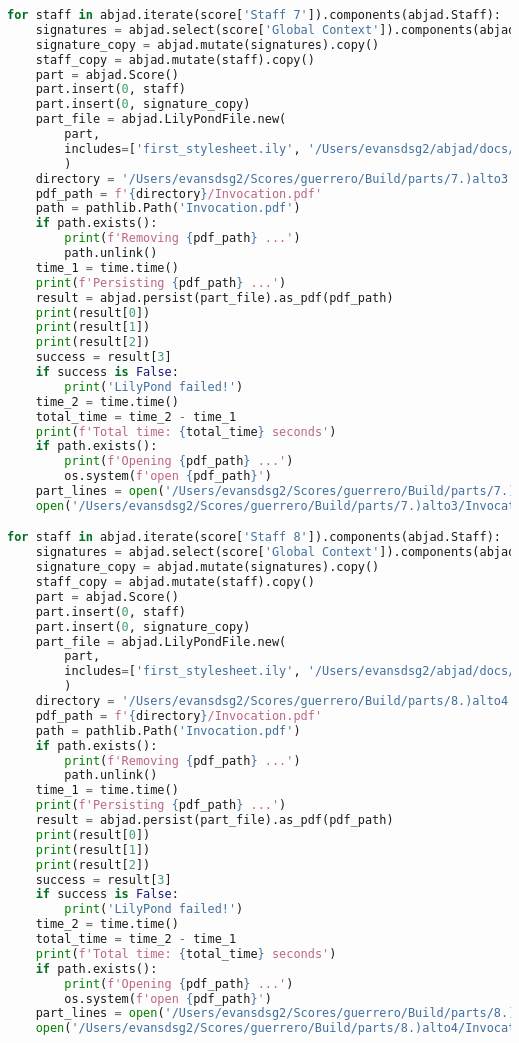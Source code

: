 \begin{lstlisting}[language=Python, caption=Invocation Source Code]
for staff in abjad.iterate(score['Staff 7']).components(abjad.Staff):
    signatures = abjad.select(score['Global Context']).components(abjad.Staff)
    signature_copy = abjad.mutate(signatures).copy()
    staff_copy = abjad.mutate(staff).copy()
    part = abjad.Score()
    part.insert(0, staff)
    part.insert(0, signature_copy)
    part_file = abjad.LilyPondFile.new(
        part,
        includes=['first_stylesheet.ily', '/Users/evansdsg2/abjad/docs/source/_stylesheets/abjad.ily'],
        )
    directory = '/Users/evansdsg2/Scores/guerrero/Build/parts/7.)alto3'
    pdf_path = f'{directory}/Invocation.pdf'
    path = pathlib.Path('Invocation.pdf')
    if path.exists():
        print(f'Removing {pdf_path} ...')
        path.unlink()
    time_1 = time.time()
    print(f'Persisting {pdf_path} ...')
    result = abjad.persist(part_file).as_pdf(pdf_path)
    print(result[0])
    print(result[1])
    print(result[2])
    success = result[3]
    if success is False:
        print('LilyPond failed!')
    time_2 = time.time()
    total_time = time_2 - time_1
    print(f'Total time: {total_time} seconds')
    if path.exists():
        print(f'Opening {pdf_path} ...')
        os.system(f'open {pdf_path}')
    part_lines = open('/Users/evansdsg2/Scores/guerrero/Build/parts/7.)alto3/Invocation.ly').readlines()
    open('/Users/evansdsg2/Scores/guerrero/Build/parts/7.)alto3/Invocation.ly', 'w').writelines(part_lines[15:-1])

for staff in abjad.iterate(score['Staff 8']).components(abjad.Staff):
    signatures = abjad.select(score['Global Context']).components(abjad.Staff)
    signature_copy = abjad.mutate(signatures).copy()
    staff_copy = abjad.mutate(staff).copy()
    part = abjad.Score()
    part.insert(0, staff)
    part.insert(0, signature_copy)
    part_file = abjad.LilyPondFile.new(
        part,
        includes=['first_stylesheet.ily', '/Users/evansdsg2/abjad/docs/source/_stylesheets/abjad.ily'],
        )
    directory = '/Users/evansdsg2/Scores/guerrero/Build/parts/8.)alto4'
    pdf_path = f'{directory}/Invocation.pdf'
    path = pathlib.Path('Invocation.pdf')
    if path.exists():
        print(f'Removing {pdf_path} ...')
        path.unlink()
    time_1 = time.time()
    print(f'Persisting {pdf_path} ...')
    result = abjad.persist(part_file).as_pdf(pdf_path)
    print(result[0])
    print(result[1])
    print(result[2])
    success = result[3]
    if success is False:
        print('LilyPond failed!')
    time_2 = time.time()
    total_time = time_2 - time_1
    print(f'Total time: {total_time} seconds')
    if path.exists():
        print(f'Opening {pdf_path} ...')
        os.system(f'open {pdf_path}')
    part_lines = open('/Users/evansdsg2/Scores/guerrero/Build/parts/8.)alto4/Invocation.ly').readlines()
    open('/Users/evansdsg2/Scores/guerrero/Build/parts/8.)alto4/Invocation.ly', 'w').writelines(part_lines[15:-1])


\end{lstlisting}
